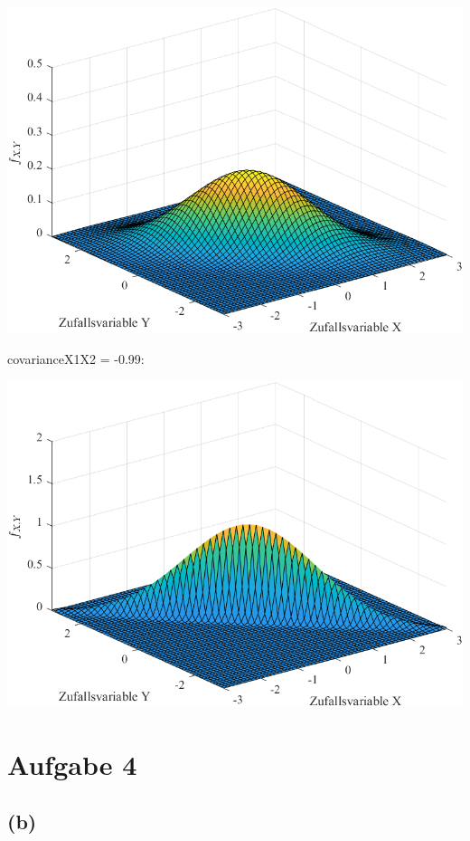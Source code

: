 \documentclass[a4paper]{scrartcl}
\begin{document}
\begin{center}
	\includegraphics*[scale = 0.5]{question3b3.png}
\end{center}
covarianceX1X2 = -0.99:
\begin{center}
	\includegraphics*[scale = 0.5]{question3b4.png}
\end{center}

\section*{Aufgabe 4}

\subsection*{(b)}
\end{document}
